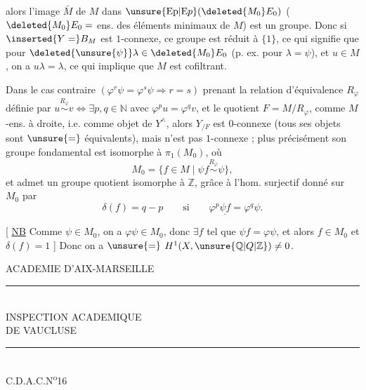 

alors l'image $\bar M$ de $M$ dans $\unsure{\mathrm{Ep}|\mathrm{E}p}(\deleted{M_0}E_0)$ ($\deleted{M_0}E_0=$ ens. des
éléments minimaux de $M$) est un groupe. Donc
si $\inserted{Y=}B_M$ est $1$-connexe, ce groupe est réduit à $\{1\}$,
ce qui signifie que pour $\deleted{\unsure{\psi}}\lambda\in\deleted{M_0}E_0$ (p. ex.
pour $\lambda=\psi$),  et $u\in M$, on a $u\lambda=\lambda$,
ce qui implique que $M$ est cofiltrant.

Dans le cas contraire $(\varphi^r\psi=\varphi^s\psi\Longrightarrow r=s)$
prenant la relation d'équivalence  $R_\varphi$  définie par
$u\overset{R_\varphi}{\sim}v\Longleftrightarrow\exists p,q\in\mathbb N$ avec $\varphi^p u=\varphi^q v$, et
le quotient $F=M/R_\varphi$,  comme $M$-ens.
à droite, i.e. comme objet de $Y^\wedge$, alors
$Y_{/F}$ est  $0$-connexe (tous ses objets sont $\unsure{=}$
équivalents), mais  n'est pas $1$-connexe ;
plus précisément son groupe fondamental
est isomorphe à $\pi_1(M_0)$, où 
\[
M_0=\{f\in M\mid\psi f\overset{R_\varphi}{\sim}\psi\},
\]
et admet un groupe quotient isomorphe à $\mathbb Z$,
grâce à l'hom. surjectif
donné sur $M_0$ par
\[
\delta(f)=q-p\qquad\text{si}\qquad\varphi^p\underline{\psi f}=\varphi^q\psi.
\]

[ \uline{NB}   Comme $\psi\in M_0$, on a $\varphi\psi\in M_0$,
 donc $\exists f$ tel que $\psi f=\varphi\psi$,
et alors $f\in M_0$ et $\delta(f)=1$ ] Donc on a $\unsure{=}$
$H^{1}(X,\unsure{\mathbb Q|Q|\mathbb Z})\ne0$.


ACADEMIE D'AIX-MARSEILLE\\
\rule{2cm}{0.4pt}\\
INSPECTION ACADEMIQUE\\
DE VAUCLUSE\\
\rule{0.9cm}{0.4pt}\\

C.D.A.C.N\textsuperscript{o}16\\

